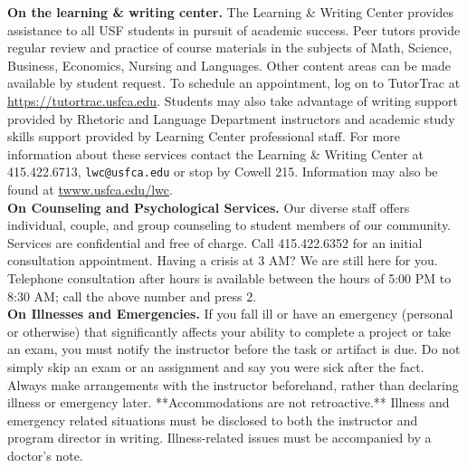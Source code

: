 \documentclass[11pt]{article}
\begin{document}
\noindent \textbf{On the learning \& writing center.} The Learning \& Writing Center provides assistance to all USF students in pursuit of academic success. Peer tutors provide regular review and practice of course materials in the subjects of Math, Science, Business, Economics, Nursing and Languages. Other content areas can be made available by student request. To schedule an appointment, log on to TutorTrac at \url{https://tutortrac.usfca.edu}. Students may also take advantage of writing support provided by Rhetoric and Language Department instructors and academic study skills support provided by Learning Center professional staff. For more information about these services contact the Learning \& Writing Center at 415.422.6713, \verb!lwc@usfca.edu! or stop by Cowell 215. Information may also be found at \url{twww.usfca.edu/lwc}.\\

\noindent \textbf{On Counseling and Psychological Services.}  Our diverse staff offers individual, couple, and group counseling to student members of our community. Services are confidential and free of charge. Call 415.422.6352 for an initial consultation appointment. Having a crisis at 3 AM? We are still here for you. Telephone consultation after hours is available between the hours of 5:00 PM to 8:30 AM; call the above number and press 2.\\

\noindent \textbf{On Illnesses and Emergencies.} If you fall ill or have an emergency (personal or otherwise) that significantly affects your ability to complete a project or take an exam, you must notify the instructor before the task or artifact is due. Do not simply skip an exam or an assignment and say you were sick after the fact. Always make arrangements with the instructor beforehand, rather than declaring illness or emergency later. **Accommodations are not retroactive.**  Illness and emergency related situations must be disclosed to both the instructor and program director in writing. Illness-related issues must be accompanied by a doctor’s note.\\
\end{document}
